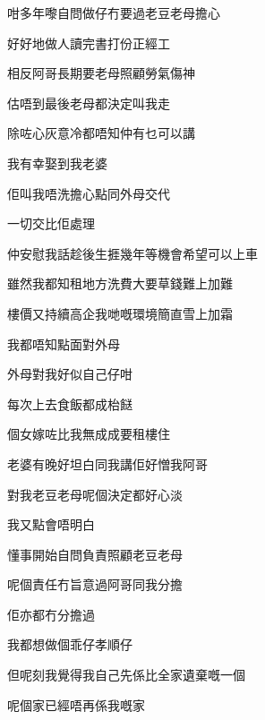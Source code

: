 咁多年嚟自問做仔冇要過老豆老母擔心

好好地做人讀完書打份正經工

相反阿哥長期要老母照顧勞氣傷神

估唔到最後老母都決定叫我走

除咗心灰意冷都唔知仲有乜可以講

我有幸娶到我老婆

佢叫我唔洗擔心點同外母交代

一切交比佢處理

仲安慰我話趁後生捱幾年等機會希望可以上車

雖然我都知租地方洗費大要草錢難上加難

樓價又持續高企我哋嘅環境簡直雪上加霜

我都唔知點面對外母

外母對我好似自己仔咁

每次上去食飯都成枱餸

個女嫁咗比我無成成要租樓住

老婆有晚好坦白同我講佢好憎我阿哥

對我老豆老母呢個決定都好心淡

我又點會唔明白

懂事開始自問負責照顧老豆老母

呢個責任冇旨意過阿哥同我分擔

佢亦都冇分擔過

我都想做個乖仔孝順仔

但呢刻我覺得我自己先係比全家遺棄嘅一個

呢個家已經唔再係我嘅家

